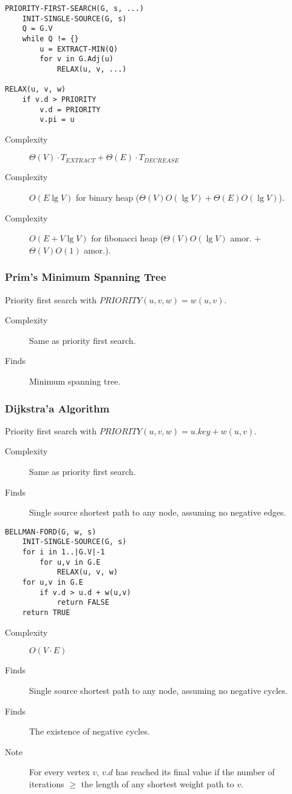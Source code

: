\documentclass[10pt, a4paper,landscape]{article}
\begin{document}
\begin{multicols*}{4}
\begin{lstlisting}
PRIORITY-FIRST-SEARCH(G, s, ...)
    INIT-SINGLE-SOURCE(G, s)
    Q = G.V
    while Q != {}
        u = EXTRACT-MIN(Q)
        for v in G.Adj(u)
            RELAX(u, v, ...)

RELAX(u, v, w)
    if v.d > PRIORITY
        v.d = PRIORITY
        v.pi = u
\end{lstlisting}
\begin{description}
    \item[Complexity] $\Theta(V)\cdot T_{EXTRACT} + \Theta(E)\cdot T_{DECREASE}$
    \item[Complexity] $O(E\lg{V})$ for binary heap ($\Theta(V) O(\lg V) + \Theta(E) O(\lg V)$).
    \item[Complexity] $O(E + V\lg{V})$ for fibonacci heap ($\Theta(V) O(\lg V)$ amor. + $\Theta(V) O(1)$ amor.).
\end{description}

\subsubsection{Prim's Minimum Spanning Tree}
Priority first search with $PRIORITY(u, v, w) = w(u, v)$.
\begin{description}
    \item[Complexity] Same as priority first search.
    \item[Finds] Minimum spanning tree.
\end{description}

\subsubsection{Dijkstra'a Algorithm}
Priority first search with $PRIORITY(u, v, w) = u.key + w(u, v)$.
\begin{description}
    \item[Complexity] Same as priority first search.
    \item[Finds] Single source shortest path to any node, assuming no negative edges.
\end{description}

\begin{lstlisting}
BELLMAN-FORD(G, w, s)
    INIT-SINGLE-SOURCE(G, s)
    for i in 1..|G.V|-1
        for u,v in G.E
            RELAX(u, v, w)
    for u,v in G.E
        if v.d > u.d + w(u,v)
            return FALSE
    return TRUE
\end{lstlisting}

\begin{description}
    \item[Complexity] $O(V\cdot E)$
    \item[Finds] Single source shortest path to any node, assuming no negative cycles.
    \item[Finds] The existence of negative cycles.
    \item[Note] For every vertex $v$, $v.d$ has reached its final value if the number of iterations $\geq$ the length of any shortest weight path to $v$.
\end{description}


\end{multicols*}
\end{document}
